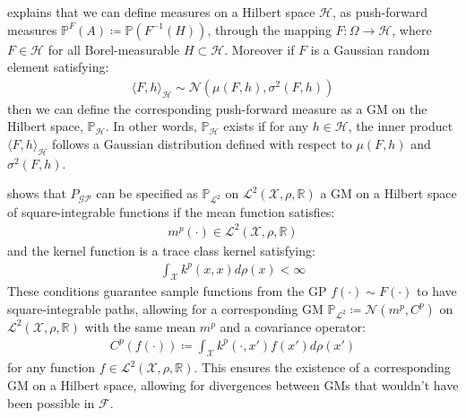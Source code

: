 \documentclass{article}
\newcommand{\GP}{\operatorname{\mathcal{GP}}}
\numberwithin{equation}{section}
\begin{document}
\cite{wild2022generalized} explains that we can define measures on a Hilbert space $\mathcal{H}$, as push-forward measures $\mathbb{P}^{F}(A) \coloneqq \mathbb{P}(F^{-1}(H))$, through the mapping $F: \Omega \rightarrow \mathcal{H}$, where $F \in \mathcal{H}$ for all Borel-measurable $H \subset \mathcal{H}$. Moreover if $F$ is a Gaussian random element satisfying:
\begin{align}
    \langle F, h \rangle_\mathcal{H} \sim \mathcal{N}\left(\mu(F, h), \sigma^2(F, h)\right)
\label{gre}
\end{align}
then we can define the corresponding push-forward measure as a GM on the Hilbert space, $\mathbb{P}_{\mathcal{H}}$. In other words, $\mathbb{P}_{\mathcal{H}}$ exists if for any $h \in \mathcal{H}$, the inner product $\langle F, h \rangle_\mathcal{H}$ follows a Gaussian distribution defined with respect to $\mu(F, h)$ and $\sigma^2(F, h)$.

\cite{wild2022generalized} shows that $P_{\GP}$ can be specified as $\mathbb{P}_{\mathcal{L}^2}$ on $\mathcal{L}^2(\mathcal{X}, \rho, \mathbb{R})$ a GM on a Hilbert space of square-integrable functions if the mean function satisfies:
\begin{align}
    \label{smooth-mean-function-condition}
    m^p(\cdot) \in \mathcal{L}^2(\mathcal{X}, \rho, \mathbb{R})
\end{align}
and the kernel function is a trace class kernel satisfying:
\begin{align}
    \int_{\mathcal{X}} k^p(x, x) d\rho(x) < \infty
    \label{trace-kernel-condition}
\end{align}
These conditions guarantee sample functions from the GP $f(\cdot) \sim F(\cdot)$ to have square-integrable paths, allowing for a corresponding GM $\mathbb{P}_{\mathcal{L}^2} \coloneqq \mathcal{N}(m^p, C^p)$ on $\mathcal{L}^2(\mathcal{X}, \rho, \mathbb{R})$ with the same mean $m^p$ and a covariance operator:
\begin{align}
    C^p(f(\cdot)) \coloneqq \int_{\mathcal{X}} k^p(\cdot, x')f(x')d \rho(x')
    \label{gm-covariance-operator}
\end{align}
for any function $f \in \mathcal{L}^2(\mathcal{X}, \rho, \mathbb{R})$. This ensures the existence of a corresponding GM on a Hilbert space, allowing for divergences between GMs that wouldn't have been possible in $\mathcal{F}$. 
\end{document}
